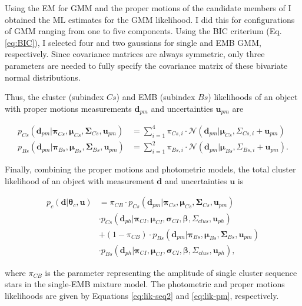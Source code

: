 Using the EM for GMM and the proper motions of the candidate members of \citet{Bouy2015} I obtained the ML estimates for the GMM likelihood. I did this for configurations of GMM ranging from one to five components. Using the BIC criterium (Eq. \ref{eq:BIC}), I selected four and two gaussians for single and EMB GMM, respectively. Since covariance matrices are always symmetric, only three parameters are needed to fully specify the covariance matrix of these bivariate normal distributions.

Thus, the cluster (subindex $Cs$) and EMB (subindex $Bs$) likelihoods of an object with proper motions measurements $\mathbf{d}_{pm}$ and uncertainties $\mathbf{u}_{pm}$ are

\begin{align}
p_{Cs}(\mathbf{d}_{pm}| \boldsymbol{\pi}_{Cs}, \boldsymbol{\mu}_{Cs},\boldsymbol{\Sigma}_{Cs},\mathbf{u}_{pm})
&= \sum_{i=1}^4\pi_{Cs,i}\cdot \mathcal{N}(\mathbf{d}_{pm} | \boldsymbol{\mu}_{Cs},\Sigma_{Cs,i}+\mathbf{u}_{pm}) \nonumber\\
p_{Bs}(\mathbf{d}_{pm}| \boldsymbol{\pi}_{Bs}, \boldsymbol{\mu}_{Bs},\boldsymbol{\Sigma}_{Bs},\mathbf{u}_{pm})
&= \sum_{i=1}^2\pi_{Bs,i}\cdot \mathcal{N}(\mathbf{d}_{pm} | \boldsymbol{\mu}_{Bs},\Sigma_{Bs,i}+\mathbf{u}_{pm}).
\label{eq:lik-pm}
\end{align}

Finally, combining the proper motions and photometric models, the total cluster likelihood of an object with measurement $\mathbf{d}$ and uncertainties $\mathbf{u}$ is

\begin{align}
p_c(\mathbf{d}|\boldsymbol{\theta}_c,\mathbf{u})&=\pi_{CB}\cdot p_{Cs}(\mathbf{d}_{pm}| \boldsymbol{\pi}_{Cs}, \boldsymbol{\mu}_{Cs},\boldsymbol{\Sigma}_{Cs},\mathbf{u}_{pm}) \nonumber \\ &\cdot  p_{Cs}(\mathbf{d}_{ph}|\boldsymbol{\pi}_{CI},\boldsymbol{\mu}_{CI},\boldsymbol{\sigma}_{CI},\boldsymbol{\beta},\Sigma_{clus},\mathbf{u}_{ph})\nonumber\\
&+(1-\pi_{CB})\cdot p_{Bs}(\mathbf{d}_{pm}| \boldsymbol{\pi}_{Bs}, \boldsymbol{\mu}_{Bs},\boldsymbol{\Sigma}_{Bs},\mathbf{u}_{pm}) \nonumber \\
&\cdot  p_{Bs}(\mathbf{d}_{ph}|\boldsymbol{\pi}_{CI},\boldsymbol{\mu}_{CI},\boldsymbol{\sigma}_{CI}, \boldsymbol{\beta},\Sigma_{clus}, \mathbf{u}_{ph}),
\end{align}

where $\pi_{CB}$ is the parameter representing the amplitude of single cluster sequence stars in the single-EMB mixture model. The photometric and proper motions likelihoods are given by Equations \ref{eq:lik-seq2} and \ref{eq:lik-pm}, respectively.
 
